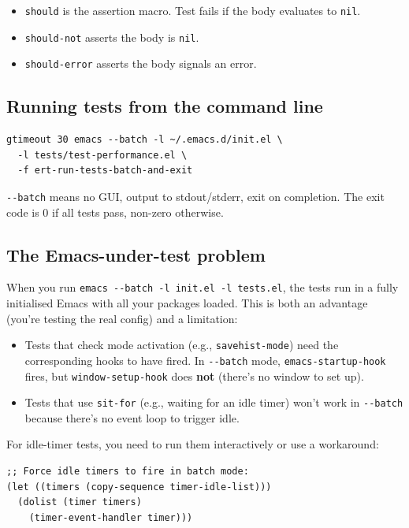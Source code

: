 \begin{itemize}
\item \texttt{should} is the assertion macro. Test fails if the body evaluates to \texttt{nil}.
\item \texttt{should-not} asserts the body is \texttt{nil}.
\item \texttt{should-error} asserts the body signals an error.
\end{itemize}

\subsection{Running tests from the command line}\label{running-tests-from-the-command-line}

\begin{verbatim}
gtimeout 30 emacs --batch -l ~/.emacs.d/init.el \
  -l tests/test-performance.el \
  -f ert-run-tests-batch-and-exit
\end{verbatim}

\texttt{-\/-batch} means no GUI, output to stdout/stderr, exit on completion. The exit code is 0 if all tests pass, non-zero otherwise.

\subsection{The Emacs-under-test problem}\label{the-emacs-under-test-problem}

When you run \texttt{emacs -\/-batch -l init.el -l tests.el}, the tests run in a fully initialised Emacs with all your packages loaded. This is both an advantage (you're testing the real config) and a limitation:

\begin{itemize}
\item Tests that check mode activation (e.g., \texttt{savehist-mode}) need the corresponding hooks to have fired. In \texttt{-\/-batch} mode, \texttt{emacs-startup-hook} fires, but \texttt{window-setup-hook} does \textbf{not} (there's no window to set up).
\item Tests that use \texttt{sit-for} (e.g., waiting for an idle timer) won't work in \texttt{-\/-batch} because there's no event loop to trigger idle.
\end{itemize}

For idle-timer tests, you need to run them interactively or use a workaround:

\begin{verbatim}
;; Force idle timers to fire in batch mode:
(let ((timers (copy-sequence timer-idle-list)))
  (dolist (timer timers)
    (timer-event-handler timer)))
\end{verbatim}

